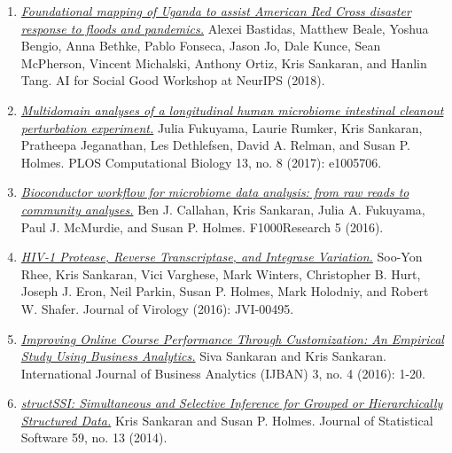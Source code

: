 \documentclass[letterpaper]{article}
\begin{document}
\begin{enumerate}
  \item \href{https://aiforsocialgood.github.io/2018/pdfs/track2/81_aisg_neurips2018.pdf}{\textit{Foundational mapping of Uganda to assist American Red Cross disaster response to floods and pandemics.}} Alexei Bastidas, Matthew Beale, Yoshua Bengio, Anna Bethke, Pablo Fonseca, Jason Jo, Dale Kunce, Sean McPherson, Vincent Michalski, Anthony Ortiz, Kris Sankaran, and Hanlin Tang. AI for Social Good Workshop at NeurIPS (2018).
  \item \href{https://doi.org/10.1371/journal.pcbi.1005706 }{\textit{Multidomain analyses of a longitudinal human microbiome intestinal cleanout perturbation experiment.}} Julia Fukuyama, Laurie Rumker, Kris Sankaran, Pratheepa Jeganathan, Les Dethlefsen, David A. Relman, and Susan P. Holmes. PLOS Computational Biology 13, no. 8 (2017): e1005706.
  \item \href{https://doi.org/10.12688/f1000research.8986.2}{\textit{Bioconductor workflow for microbiome data analysis: from raw reads to community analyses.}} Ben J. Callahan, Kris Sankaran, Julia A. Fukuyama, Paul J. McMurdie, and Susan P. Holmes. F1000Research 5 (2016).
  \item \href{https://doi.org/10.1128/jvi.00495-16}{\textit{HIV-1 Protease, Reverse Transcriptase, and Integrase Variation.}} Soo-Yon Rhee, Kris Sankaran, Vici Varghese, Mark Winters, Christopher B. Hurt, Joseph J. Eron, Neil Parkin, Susan P. Holmes, Mark Holodniy, and Robert W. Shafer. Journal of Virology (2016): JVI-00495.
  \item \href{https://www.igi-global.com/chapter/improving-online-course-performance-through-customization/183535}{\textit{Improving Online Course Performance Through Customization: An Empirical Study Using Business Analytics.}} Siva Sankaran and Kris Sankaran. International Journal of Business Analytics (IJBAN) 3, no. 4 (2016): 1-20.
  \item \href{https://doi.org/10.18637/jss.v059.i13}{\textit{structSSI: Simultaneous and Selective Inference for Grouped or Hierarchically Structured Data.}} Kris Sankaran and Susan P. Holmes. Journal of Statistical Software 59, no. 13 (2014).
\end{enumerate}
\end{document}
